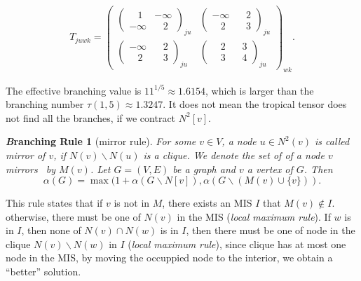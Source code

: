\documentclass{article}
\newcommand{\<}{\langle}
\renewcommand{\>}{\rangle}
\renewcommand{\cite}[1]{{\citep{#1}}}
\newtheorem{corollary}{\textit Branching Rule}
\theoremstyle{definition}\newtheorem{definition}{\textit{Definition}}
\begin{document}
\begin{align}
    T_{juwk} = \left(\begin{matrix}
        \left(\begin{matrix}
        ~~~~1 & -\infty \\
        -\infty & ~~~~2
        \end{matrix}\right)_{ju}&
        \left(\begin{matrix}
        -\infty & ~~~~2 \\
        ~~~~2 & ~~~~3
        \end{matrix}\right)_{ju}\\
        \left(\begin{matrix}
        -\infty & ~~~~2 \\
        ~~~~2 & ~~~~3
        \end{matrix}\right)_{ju} &
        \left(\begin{matrix}
        ~~~~2 & ~~~~3 \\
        ~~~~3 & ~~~~4
        \end{matrix}\right)_{ju}
    \end{matrix}\right)_{wk}.
\end{align}

The effective branching value is $11^{1/5} \approx 1.6154$, which is larger than the branching number $\tau(1, 5) \approx 1.3247$.
It does not mean the tropical tensor does not find all the branches, if we contract $N^2[v]$.

\begin{corollary}[mirror rule] %
For some $v \in V$, a node $u \in N^2(v)$ is called mirror of $v$, if $N(v) \backslash N(u)$ is a clique. We denote the set of of a node $v$ mirrors~\cite{Fomin2013} by $M(v)$.
Let $G = (V, E)$ be a graph and $v$ a vertex of $G$. Then
\begin{equation}
\alpha(G) = \max(1 + \alpha(G \backslash N[v]), \alpha(G \backslash (M(v) \cup \{v\})).
\end{equation}
\end{corollary}

This rule states that if $v$ is not in $M$, there exists an MIS $I$ that $M(v)\notin I$.
otherwise, there must be one of $N(v)$ in the MIS (\textit{local maximum rule}).
If $w$ is in $I$, then none of $N(v) \cap N(w)$ is in $I$, then there must be one of node in the clique $N(v)\backslash N(w)$ in $I$ (\textit{local maximum rule}),
since clique has at most one node in the MIS, by moving the occuppied node to the interior, we obtain a ``better'' solution.
\end{document}
